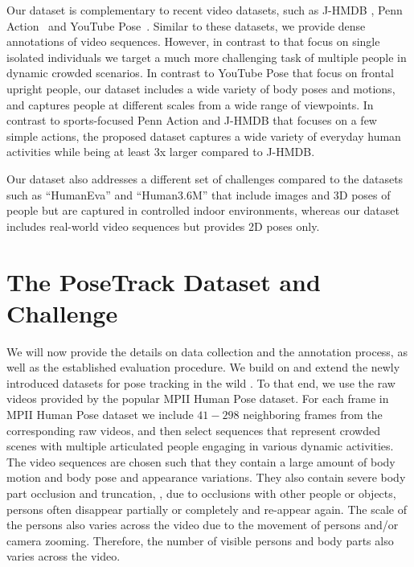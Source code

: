 \documentclass[10pt,twocolumn,letterpaper]{article}
\begin{document}
Our dataset is complementary to recent video datasets, such as J-HMDB
\cite{Jhuang:ICCV:2013}, Penn Action~\cite{zhang2013actemes} and YouTube
Pose~\cite{Charles16}. Similar to these datasets, we provide dense
annotations of video sequences. However, in contrast to
\cite{Jhuang:ICCV:2013,zhang2013actemes,Charles16} that focus on single
isolated individuals we target a much more challenging task of multiple
people in dynamic crowded scenarios. In contrast to YouTube Pose that
focus on frontal upright people, our dataset includes a wide variety of
body poses and motions, and captures people at different scales from a
wide range of viewpoints. In contrast to sports-focused Penn Action
and J-HMDB that focuses on a few simple actions, the proposed dataset
captures a wide variety of everyday human activities while being at least 3x
larger compared to J-HMDB.



Our dataset also addresses a different set of challenges compared to
the datasets such as ``HumanEva'' \cite{Sigal:2010:HSV} and
``Human3.6M'' \cite{Ionescu:2014:H36} that include images and 3D poses
of people but are captured in controlled indoor environments,
whereas our dataset includes real-world video sequences but provides
2D poses only.

















 \section{The PoseTrack Dataset and Challenge}
\label{sec:dataset}



We will now provide the details on data collection and the annotation process, as well as the established evaluation procedure.
 We build on and extend the newly
 introduced datasets for pose tracking in the wild \cite{insafutdinov17cvpr,Iqbal:2017:CVPR}. To that end, we use the raw videos provided by the popular MPII
Human Pose dataset. For each frame in MPII Human Pose dataset we include $41-298$ neighboring 
frames from the corresponding raw videos, and then select sequences that represent 
crowded scenes with multiple articulated people engaging in various dynamic activities. 
The video sequences are chosen such that they contain a large amount of body motion and body pose and appearance variations. They also contain severe body part occlusion and truncation, \ie, due to occlusions with other people or objects, persons often disappear partially or completely and re-appear again. The scale of the persons also varies across the video due to the movement of persons and/or camera zooming. Therefore, the number of visible persons and body parts also varies across the video. 
\end{document}
